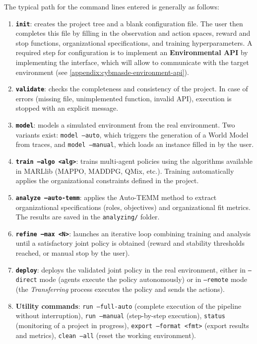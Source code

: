\noindent The typical path for the command lines entered is generally as follows:
\begin{enumerate}
  \item \textbf{\texttt{init}}: creates the project tree and a blank configuration file.
        The user then completes this file by filling in the observation and action spaces, reward and stop functions, organizational specifications, and training hyperparameters. A required step for configuration is to implement an \textbf{Environmental API} by implementing the  interface, which will allow  to communicate with the target environment (see \autoref{appendix:cybmasde-environment-api}).
  \item \textbf{\texttt{validate}}: checks the completeness and consistency of the project.
        In case of errors (missing file, unimplemented function, invalid API), execution is stopped with an explicit message.
  \item \textbf{\texttt{model}}: models a simulated environment from the real environment.
        Two variants exist:
        \texttt{model --auto}, which triggers the generation of a World Model from traces, and
        \texttt{model --manual}, which loads an instance  filled in by the user.
  \item \textbf{\texttt{train --algo <alg>}}: trains multi-agent policies using the algorithms available in MARLlib (MAPPO, MADDPG, QMix, etc.).
        Training automatically applies the organizational constraints defined in the project.
  \item \textbf{\texttt{analyze --auto-temm}}: applies the Auto-TEMM method to extract organizational specifications (roles, objectives) and organizational fit metrics.
        The results are saved in the \texttt{analyzing/} folder.
  \item \textbf{\texttt{refine --max <N>}}: launches an iterative loop combining training and analysis until a satisfactory joint policy is obtained (reward and stability thresholds reached, or manual stop by the user).
  \item \textbf{\texttt{deploy}}: deploys the validated joint policy in the real environment, either in \texttt{--direct} mode (agents execute the policy autonomously) or in \texttt{--remote} mode (the \textit{Transferring} process executes the policy and sends the actions).
  \item \textbf{Utility commands}:
        \texttt{run --full-auto} (complete execution of the pipeline without interruption),
        \texttt{run --manual} (step-by-step execution),
        \texttt{status} (monitoring of a project in progress),
        \texttt{export --format <fmt>} (export results and metrics),
        \texttt{clean --all} (reset the working environment).
\end{enumerate}

